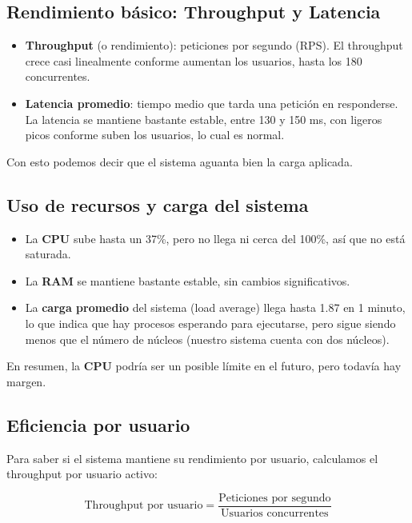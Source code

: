 \documentclass[10pt]{book}
\begin{document}
\subsection{Rendimiento básico: Throughput y Latencia}

\begin{itemize}
  \item \textbf{Throughput} (o rendimiento): peticiones por segundo (RPS). El throughput crece casi linealmente conforme aumentan los usuarios, hasta los 180 concurrentes.
  
  \item \textbf{Latencia promedio}: tiempo medio que tarda una petición en responderse. La latencia se mantiene bastante estable, entre 130 y 150 ms, con ligeros picos conforme suben los usuarios, lo cual es normal.
\end{itemize}

Con esto podemos decir que el sistema aguanta bien la carga aplicada.

\subsection{Uso de recursos y carga del sistema}

\begin{itemize}
  \item La \textbf{CPU} sube hasta un 37\%, pero no llega ni cerca del 100\%, así que no está saturada.
  
  \item La \textbf{RAM} se mantiene bastante estable, sin cambios significativos.
  
  \item La \textbf{carga promedio} del sistema (load average) llega hasta 1.87 en 1 minuto, lo que indica que hay procesos esperando para ejecutarse, pero sigue siendo menos que el número de núcleos (nuestro sistema cuenta con dos núcleos).
\end{itemize}

En resumen, la \textbf{CPU} podría ser un posible límite en el futuro, pero todavía hay margen.

\subsection{Eficiencia por usuario}

Para saber si el sistema mantiene su rendimiento por usuario, calculamos el throughput por usuario activo:

\[
\text{Throughput por usuario} = \frac{\text{Peticiones por segundo}}{\text{Usuarios concurrentes}}
\]
\end{document}
